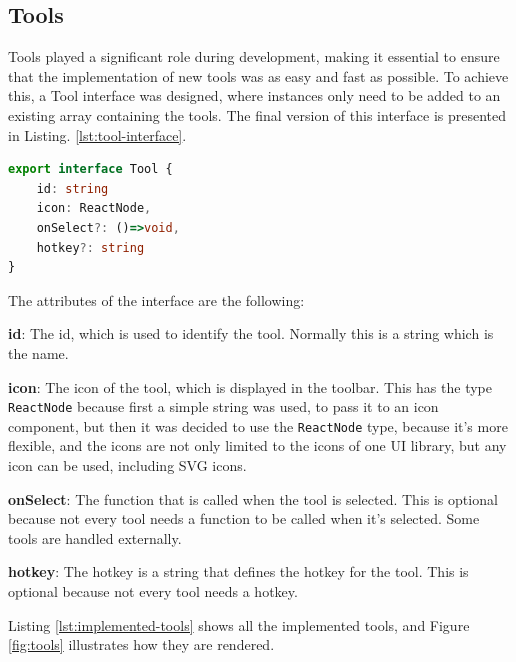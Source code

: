 \subsection{Tools}
Tools played a significant role during development, making it essential to ensure that the implementation of new tools was as easy and fast as possible. To achieve this, a Tool interface was designed, where instances only need to be added to an existing array containing the tools. The final version of this interface is presented in Listing. \ref{lst:tool-interface}.

\begin{lstlisting}[language=TypeScript,caption={Tool interface},label={lst:tool-interface}]
export interface Tool {
    id: string
    icon: ReactNode,
    onSelect?: ()=>void,
    hotkey?: string
}
\end{lstlisting}

The attributes of the interface are the following:
\begin{compactitem}
\item \textbf{id}: The id, which is used to identify the tool. Normally this is a string which is the name.
\item \textbf{icon}: The icon of the tool, which is displayed in the toolbar. This has the type \texttt{ReactNode} because first a simple string was used, to pass it to an icon component, but then it was decided to use the \texttt{ReactNode} type, because it's more flexible, and the icons are not only limited to the icons of one UI library, but any icon can be used, including SVG icons.
\item \textbf{onSelect}: The function that is called when the tool is selected. This is optional because not every tool needs a function to be called when it's selected. Some tools are handled externally.
\item \textbf{hotkey}: The hotkey is a string that defines the hotkey for the tool. This is optional because not every tool needs a hotkey.
\end{compactitem}

Listing \ref{lst:implemented-tools} shows all the implemented tools, and Figure \ref{fig:tools} illustrates how they are rendered.

